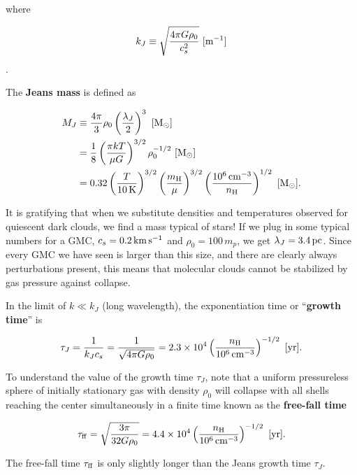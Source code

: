 \documentclass[a4paper,10pt]{article}
\begin{document}
{\noindent}where

\begin{align*}
    k_J \equiv \sqrt{\frac{4\pi G\rho_0}{c_s^2}} ~ [{\rm m^{-1}}]
\end{align*}.

{\noindent}The \textbf{Jeans mass} is defined as

\begin{align*}
    M_J &\equiv \frac{4\pi}{3}\rho_0 \left(\frac{\lambda_J}{2}\right)^3 ~ [{\rm M_\odot}] \\
        &= \frac{1}{8} \left(\frac{\pi kT}{\mu G}\right)^{3/2} \rho_0^{-1/2} ~ [{\rm M_\odot}] \\
        &= 0.32 \left(\frac{T}{10\,{\rm K}}\right)^{3/2} \left(\frac{m_{\rm H}}{\mu}\right)^{3/2} \left(\frac{10^6\,{\rm cm^{-3}}}{n_{\rm H}}\right)^{1/2}  ~ [{\rm M_\odot}].
\end{align*}

{\noindent}It is gratifying that when we substitute densities and temperatures observed for quiescent dark clouds, we find a mass typical of stars! If we plug in some typical numbers for a GMC, $c_s=0.2\,{\rm km\,s^{-1}}$ and $\rho_0=100\,m_p$, we get $\lambda_J=3.4\,{\rm pc}$. Since every GMC we have seen is larger than this size, and there are clearly always perturbations present, this means that molecular clouds cannot be stabilized by gas pressure against collapse. 

{\noindent}In the limit of $k\ll k_J$ (long wavelength), the exponentiation time or ``\textbf{growth time}'' is

\begin{align*}
    \tau_J = \frac{1}{k_Jc_s} = \frac{1}{\sqrt{4\pi G\rho_0}} = 2.3\times10^4 \left(\frac{n_{\rm H}}{10^6\,{\rm cm^{-3}}}\right)^{-1/2} ~ [{\rm yr}].
\end{align*}

{\noindent}To understand the value of the growth time $\tau_J$, note that a uniform pressureless sphere of initially stationary gas with density $\rho_0$ will collapse with all shells reaching the center simultaneously in a finite time known as the \textbf{free-fall time}

\begin{align*}
    \tau_{\rm ff} = \sqrt{\frac{3\pi}{32G\rho_0}} = 4.4\times10^4 \left(\frac{n_{\rm H}}{10^6\,{\rm cm^{-3}}}\right)^{-1/2} ~ [{\rm yr}].
\end{align*}

{\noindent}The free-fall time $\tau_{\rm ff}$ is only slightly longer than the Jeans growth time $\tau_J$.
\end{document}
